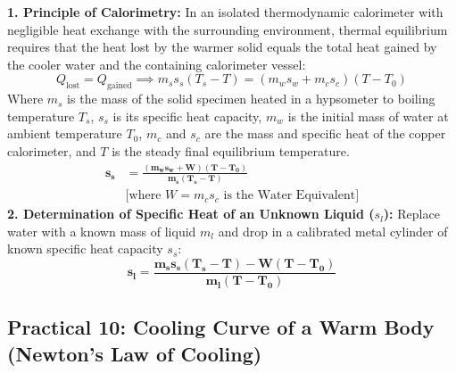 \documentclass[10pt,twoside,openright]{book}
\begin{document}
\begin{formulabox}
\textbf{1. Principle of Calorimetry:}
In an isolated thermodynamic calorimeter with negligible heat exchange with the surrounding environment, thermal equilibrium requires that the heat lost by the warmer solid equals the total heat gained by the cooler water and the containing calorimeter vessel:
\begin{equation}
  Q_{\text{lost}} = Q_{\text{gained}} \implies m_s s_s (T_s - T) = (m_w s_w + m_c s_c)(T - T_0)
\end{equation}
Where $m_s$ is the mass of the solid specimen heated in a hypsometer to boiling temperature $T_s$, $s_s$ is its specific heat capacity, $m_w$ is the initial mass of water at ambient temperature $T_0$, $m_c$ and $s_c$ are the mass and specific heat of the copper calorimeter, and $T$ is the steady final equilibrium temperature.
\begin{align}
  \mathbf{s_s} &= \mathbf{\frac{(m_w s_w + W)(T - T_0)}{m_s (T_s - T)}} \\
  &\text{[where } W = m_c s_c \text{ is the Water Equivalent]} \nonumber
\end{align}
\textbf{2. Determination of Specific Heat of an Unknown Liquid ($s_l$):}
Replace water with a known mass of liquid $m_l$ and drop in a calibrated metal cylinder of known specific heat capacity $s_s$:
\begin{equation}
  \mathbf{s_l = \frac{m_s s_s (T_s - T) - W(T - T_0)}{m_l (T - T_0)}}
\end{equation}
\end{formulabox}

\subsection{Practical 10: Cooling Curve of a Warm Body (Newton's Law of Cooling)}
\end{document}
